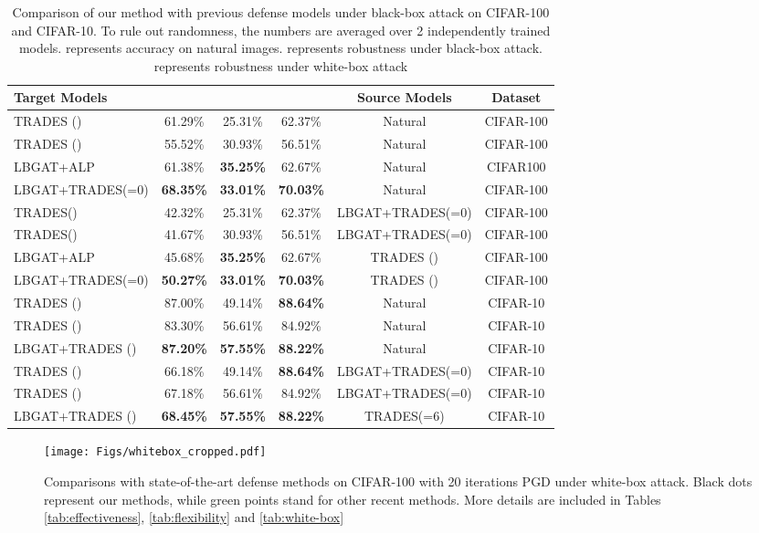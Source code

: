 \documentclass[final]{cvpr}
\begin{document}
\begin{table*}[t!]
	\centering
	\caption{Comparison of our method with previous defense models under black-box attack on CIFAR-100 and CIFAR-10. To rule out randomness, the numbers are averaged over 2 independently trained models.  represents accuracy on natural images.  represents robustness under black-box attack.  represents robustness under white-box attack}
	\begin{tabular}{l|c|c | c | c|c }
		\textbf{Target Models} & &  &  &\textbf{Source Models}  &\textbf{Dataset}\\
		\hline
		\hline
		TRADES ()  &61.29\%  &25.31\%  &62.37\%  &Natural &CIFAR-100\\
		TRADES ()  &55.52\%  &30.93\%  &56.51\%  &Natural &CIFAR-100\\
		LBGAT+ALP            &61.38\%  &\textbf{35.25\%}  &62.67\%  &Natural &CIFAR100\\
		LBGAT+TRADES(=0)  &\textbf{68.35\%} &\textbf{33.01\%} &\textbf{70.03\%} &Natural &CIFAR-100\\
		\hline
		TRADES() &42.32\% &25.31\% &62.37\% &LBGAT+TRADES(=0) &CIFAR-100\\
		TRADES() &41.67\% &30.93\% &56.51\% &LBGAT+TRADES(=0) &CIFAR-100\\
		LBGAT+ALP     &45.68\% &\textbf{35.25\%} &62.67\% &TRADES ()  &CIFAR-100\\
		LBGAT+TRADES(=0) &\textbf{50.27\%} &\textbf{33.01\%}  &\textbf{70.03\%} &TRADES () &CIFAR-100\\
		\hline
		TRADES ()  &87.00\% &49.14\%  &\textbf{88.64\%}  &Natural &CIFAR-10\\
		TRADES ()  &83.30\% &56.61\%  &84.92\%  &Natural &CIFAR-10\\
		LBGAT+TRADES ()      &\textbf{87.20\%} &\textbf{57.55\%} &\textbf{88.22\%} &Natural &CIFAR-10\\
		\hline
		TRADES () &66.18\% &49.14\% &\textbf{88.64\%} &LBGAT+TRADES(=0) &CIFAR-10\\
		TRADES () &67.18\% &56.61\% &84.92\% &LBGAT+TRADES(=0) &CIFAR-10\\
		LBGAT+TRADES ()     &\textbf{68.45\%} &\textbf{57.55\%} &\textbf{88.22\%} &TRADES(=6) &CIFAR-10\\
		\hline
		\hline
	\end{tabular}
	\label{tab:black-box_cifar100_cifar10}
\end{table*}


\begin{figure}[t]
	\begin{center}
		\texttt{[image: Figs/whitebox\_cropped.pdf]}
		\caption{Comparisons with state-of-the-art defense methods on CIFAR-100 with 20 iterations PGD under white-box attack. Black dots represent our methods, while green points stand for other recent methods. More details are included in Tables \ref{tab:effectiveness}, \ref{tab:flexibility} and \ref{tab:white-box} }
		\label{fig:whitebox}
	\end{center}
\end{figure}
\end{document}
